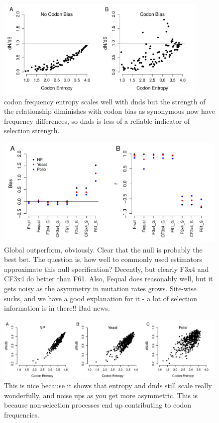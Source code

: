\documentclass[11pt]{article}
\begin{document}
\bigskip
\begin{figure}[H]
\centerline{\includegraphics[width=4in]{figures/MainText/entropy_vs_dnds.pdf}}
\caption{\label{entropy_dnds} codon frequency entropy scales well with dnds but the strength of the relationship diminishes with codon bias as synonymous now have frequency differences, so dnds is less of a reliable indicator of selection strength.}
\end{figure}


\bigskip
\begin{figure}[H]
\centerline{\includegraphics[width=6in]{figures/MainText/nyp_bias_corr.pdf}}
\caption{\label{nyp_bias_r2} Global outperform, obviously. Clear that the null is probably the best bet. The question is, how well to commonly used estimators approximate this null specification? Decently, but clearly F3x4 and CF3x4 do better than F61. Also, Fequal does reasonably well, but it gets noisy as the asymmetry in mutation rates grows. Site-wise sucks, and we have a good explanation for it - a lot of selection information is in there!! Bad news.}
\end{figure}


\bigskip
\begin{figure}[H]
\centerline{\includegraphics[width=6in]{figures/MainText/nyp_entropy_vs_dnds.pdf}}
\caption{\label{nyp_entropy_dnds} This is nice because it shows that entropy and dnds still scale really wonderfully, and noise ups as you get more asymmetric. This is because non-selection processes end up contributing to codon frequencies.}
\end{figure}
\end{document}
